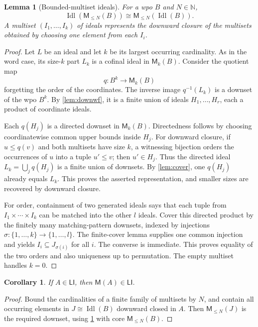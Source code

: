 \documentclass[11pt,letterpaper]{article}
\theoremstyle{teal}
\newtheorem{lemma}[theorem]{Lemma}
\newtheorem{corollary}[theorem]{Corollary}
\theoremstyle{definition}
\newcommand{\Idl}{\operatorname{Idl}}
\newcommand{\M}{\mathsf M}
\newcommand{\LI}{\mathsf{LI}}
\newcommand{\N}{\mathbb N}
\begin{document}
\begin{lemma}[Bounded-multiset ideals]\label{lem:multisets}
For a wpo $B$ and $N\in\N$,
\begin{equation}\label{eq:multiset-commute}
 \Idl(\M_{\leq N}(B))\cong\M_{\leq N}(\Idl(B)).
\end{equation}
A multiset $(I_1,\ldots,I_k)$ of ideals represents the downward closure of the multisets obtained by choosing one element from each $I_i$.
\end{lemma}
\begin{proof}
Let $L$ be an ideal and let $k$ be its largest occurring cardinality. As in the word case, its size-$k$ part $L_k$ is a cofinal ideal in $\M_k(B)$. Consider the quotient map
\[
 q:B^k\longrightarrow\M_k(B)
\]
forgetting the order of the coordinates. The inverse image $q^{-1}(L_k)$ is a downset of the wpo $B^k$. By \cref{lem:downwf}, it is a finite union of ideals $H_1,\ldots,H_r$, each a product of coordinate ideals.

Each $q(H_j)$ is a directed downset in $\M_k(B)$. Directedness follows by choosing coordinatewise common upper bounds inside $H_j$. For downward closure, if $u\leq q(v)$ and both multisets have size $k$, a witnessing bijection orders the occurrences of $u$ into a tuple $u'\leq v$; then $u'\in H_j$. Thus the directed ideal $L_k=\bigcup_j q(H_j)$ is a finite union of downsets. By \cref{lem:cover}, one $q(H_j)$ already equals $L_k$. This proves the asserted representation, and smaller sizes are recovered by downward closure.

For order, containment of two generated ideals says that each tuple from $I_1\times\cdots\times I_k$ can be matched into the other $l$ ideals. Cover this directed product by the finitely many matching-pattern downsets, indexed by injections $\sigma:\{1,\ldots,k\}\to\{1,\ldots,l\}$. The finite-cover lemma supplies one common injection and yields $I_i\subseteq J_{\sigma(i)}$ for all $i$. The converse is immediate. This proves equality of the two orders and also uniqueness up to permutation. The empty multiset handles $k=0$.
\end{proof}

\begin{corollary}\label{cor:multisets-closure}
If $A\in\LI$, then $\M(A)\in\LI$.
\end{corollary}
\begin{proof}
Bound the cardinalities of a finite family of multisets by $N$, and contain all occurring elements in $J\cong\Idl(B)$ downward closed in $A$. Then $\M_{\leq N}(J)$ is the required downset, using \cref{lem:multisets} with core $\M_{\leq N}(B)$.
\end{proof}
\end{document}
